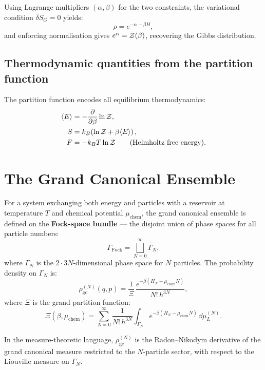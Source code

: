 Using Lagrange multipliers $(\alpha, \beta)$ for the two constraints, the variational condition $\delta S_G = 0$ yields:
\begin{equation}
\rho = e^{-\alpha - \beta H},
\end{equation}
and enforcing normalisation gives $e^\alpha = \mathcal{Z}(\beta)$, recovering the Gibbs distribution.

\subsection{Thermodynamic quantities from the partition function}

The partition function encodes all equilibrium thermodynamics:
\begin{align}
\langle E \rangle &= -\pdv{}{\beta}\ln\mathcal{Z}, \\
S &= k_B\!\left(\ln\mathcal{Z} + \beta\langle E\rangle\right), \\
F &= -k_B T \ln\mathcal{Z} \qquad \text{(Helmholtz free energy)}.
\end{align}

\section{The Grand Canonical Ensemble}

For a system exchanging both energy and particles with a reservoir at temperature $T$ and chemical potential $\mu_{\text{chem}}$, the grand canonical ensemble is defined on the \textbf{Fock-space bundle} --- the disjoint union of phase spaces for all particle numbers:
\begin{equation}
\Gamma_{\text{Fock}} = \bigsqcup_{N=0}^{\infty} \Gamma_N,
\end{equation}
where $\Gamma_N$ is the $2 \cdot 3N$-dimensional phase space for $N$ particles. The probability density on $\Gamma_N$ is:
\begin{equation}
\rho_{\text{gc}}^{(N)}(q, p) = \frac{1}{\Xi}\,\frac{e^{-\beta(H_N - \mu_{\text{chem}} N)}}{N!\,h^{3N}},
\end{equation}
where $\Xi$ is the grand partition function:
\begin{equation}
\Xi(\beta, \mu_{\text{chem}}) = \sum_{N=0}^{\infty} \frac{1}{N!\,h^{3N}}\int_{\Gamma_N} e^{-\beta(H_N - \mu_{\text{chem}} N)}\,\dd\mu_L^{(N)}.
\end{equation}

In the measure-theoretic language, $\rho_{\text{gc}}^{(N)}$ is the Radon--Nikodym derivative of the grand canonical measure restricted to the $N$-particle sector, with respect to the Liouville measure on $\Gamma_N$.

